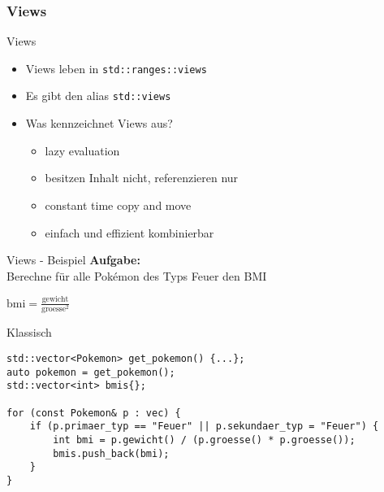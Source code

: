 \subsubsection{Views}

\begin{frame}{Views}
    \begin{itemize}
        \item<1-> Views leben in \texttt{std::ranges::views}
        \item<2-> Es gibt den alias \texttt{std::views}
        \item<3-> Was kennzeichnet Views aus?
            \begin{itemize}
                \item<4-> lazy evaluation
                \item<5-> besitzen Inhalt nicht, referenzieren nur
                \item<6-> constant time copy and move
                \item<7-> einfach und effizient kombinierbar
            \end{itemize}
    \end{itemize}
\end{frame}


\begin{frame}{Views - Beispiel}
    \textbf{Aufgabe:}\\
    Berechne für alle Pokémon des Typs Feuer den BMI

    \vspace{2.5em}

    \begin{center}
        $\text{bmi} = \frac{\text{gewicht}}{\text{groesse}^2}$
    \end{center}
\end{frame}

\begin{frame}[fragile]{Klassisch}
    \begin{verbatim}
std::vector<Pokemon> get_pokemon() {...};
auto pokemon = get_pokemon();
std::vector<int> bmis{};

for (const Pokemon& p : vec) {
    if (p.primaer_typ == "Feuer" || p.sekundaer_typ = "Feuer") {
        int bmi = p.gewicht() / (p.groesse() * p.groesse());
        bmis.push_back(bmi);
    }
}
    \end{verbatim}
\end{frame}

